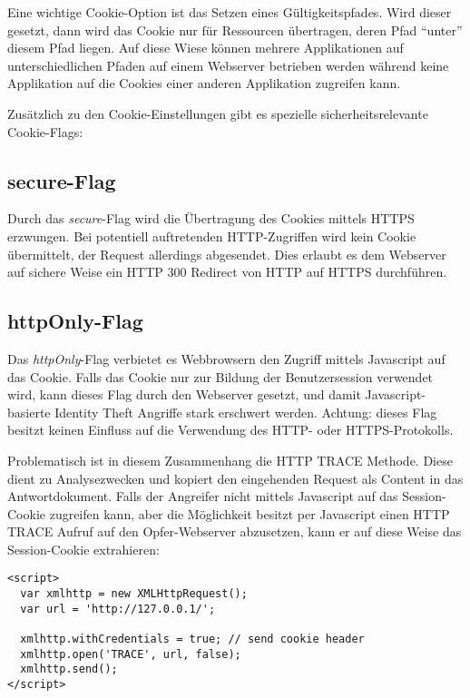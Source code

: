 Eine wichtige Cookie-Option ist das Setzen eines Gültigkeitspfades. Wird dieser gesetzt, dann wird das Cookie nur für Ressourcen übertragen, deren Pfad ``unter'' diesem Pfad liegen. Auf diese Wiese können mehrere Applikationen auf unterschiedlichen Pfaden auf einem Webserver betrieben werden während keine Applikation auf die Cookies einer anderen Applikation zugreifen kann.

Zusätzlich zu den Cookie-Einstellungen gibt es spezielle sicherheitsrelevante Cookie-Flags:

\subsection{secure-Flag}

Durch das \textit{secure}-Flag wird die Übertragung des Cookies mittels HTTPS erzwungen. Bei potentiell auftretenden HTTP-Zugriffen wird kein Cookie übermittelt, der Request allerdings abgesendet. Dies erlaubt es dem Webserver auf sichere Weise ein HTTP 300 Redirect von HTTP auf HTTPS durchführen.

\subsection{httpOnly-Flag}

Das \textit{httpOnly}-Flag verbietet es Webbrowsern den Zugriff mittels Javascript auf das Cookie. Falls das Cookie nur zur Bildung der Benutzersession verwendet wird, kann dieses Flag durch den Webserver gesetzt, und damit Javascript-basierte Identity Theft Angriffe stark erschwert werden. Achtung: dieses Flag besitzt keinen Einfluss auf die Verwendung des HTTP- oder HTTPS-Protokolls.

Problematisch ist in diesem Zusammenhang die HTTP TRACE Methode. Diese dient zu Analysezwecken und kopiert den eingehenden Request als Content in das Antwortdokument. Falls der Angreifer nicht mittels Javascript auf das Session-Cookie zugreifen kann, aber die Möglichkeit besitzt per Javascript einen HTTP TRACE Aufruf auf den Opfer-Webserver abzusetzen, kann er auf diese Weise das Session-Cookie extrahieren:

\begin{verbatim}
<script>
  var xmlhttp = new XMLHttpRequest();
  var url = 'http://127.0.0.1/';

  xmlhttp.withCredentials = true; // send cookie header
  xmlhttp.open('TRACE', url, false);
  xmlhttp.send();
</script>
\end{verbatim}

